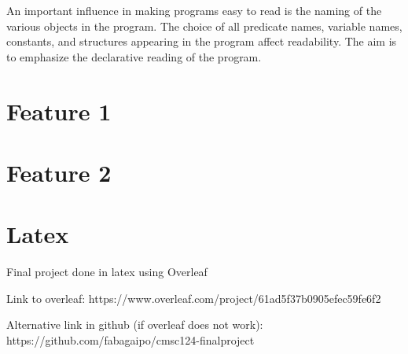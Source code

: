 \documentclass[a4paper, 12pt]{article}
\begin{document}
An important influence in making programs easy to read is the naming of the various objects in the program. The choice of all predicate names, variable names, constants, and structures appearing in the program affect readability. The aim is to emphasize the declarative reading of the program. 

\newpage
\section{Feature 1}

\newpage
\section{Feature 2}

\newpage
\section{Latex}
Final project done in latex using Overleaf

Link to overleaf: https://www.overleaf.com/project/61ad5f37b0905efec59fe6f2

Alternative link in github (if overleaf does not work): https://github.com/fabagaipo/cmsc124-finalproject

\newpage
\nocite{*} \printbibliography[heading=bibintoc,title={References}]{}
\end{document}
